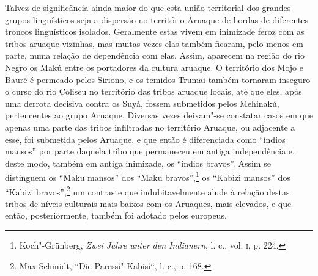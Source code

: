 Talvez de significância ainda maior do que esta união territorial dos
grandes grupos linguísticos seja a dispersão no território Aruaque de
hordas de diferentes troncos linguísticos isolados. Geralmente estas
vivem em inimizade feroz com as tribos aruaque vizinhas, mas muitas
vezes elas também ficaram, pelo menos em parte, numa relação de
dependência com elas. Assim, aparecem na região do rio Negro os Makú
entre os portadores da cultura aruaque. O território dos Mojo e Bauré é
permeado pelos Siriono, e os temidos Trumai também tornaram inseguro o
curso do rio Coliseu no território das tribos aruaque locais, até que
eles, após uma derrota decisiva contra os Suyá, fossem submetidos pelos
Mehinakú, pertencentes ao grupo Aruaque. Diversas vezes deixam"-se
constatar casos em que apenas uma parte das tribos infiltradas no
território Aruaque, ou adjacente a esse, foi submetida pelos Aruaque, e
que então é diferenciada como ``índios mansos'' por parte daquela tribo
que permaneceu em antiga independência e, deste modo, também em antiga
inimizade, os ``índios bravos''. Assim se distinguem os ``Maku mansos''
dos ``Maku bravos'',\footnote{Koch"-Grünberg, \emph{Zwei Jahre unter den
  Indianern}, l. c., vol. \textsc{i}, p. 224.} os ``Kabizi mansos'' dos ``Kabizi
bravos'',\footnote{Max Schmidt, ``Die Paressí"-Kabisí``, l. c., p. 168.}
um contraste que indubitavelmente alude à relação destas tribos de
níveis culturais mais baixos com os Aruaques, mais elevados, e que
então, posteriormente, também foi adotado pelos europeus.

